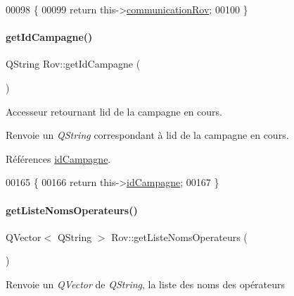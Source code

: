 \begin{DoxyCode}
00098 \{
00099     \textcolor{keywordflow}{return} this->\hyperlink{class_rov_a8e7aaa17ee2134f26d57241d11ab2a99}{communicationRov};
00100 \}
\end{DoxyCode}
\mbox{\label{class_rov_aaf98d93ef9b164a2e1766494d9577b57}} 
\paragraph{\texorpdfstring{get\+Id\+Campagne()}{getIdCampagne()}}
{\footnotesize\ttfamily Q\+String Rov\+::get\+Id\+Campagne (\begin{DoxyParamCaption}{ }\end{DoxyParamCaption})}

Accesseur retournant l\textquotesingle{}id de la campagne en cours.

\begin{DoxyReturn}{Renvoie}
un {\itshape Q\+String} correspondant à l\textquotesingle{}id de la campagne en cours. 
\end{DoxyReturn}


Références \hyperlink{class_rov_aaaed58cd7ee9edbeab5251cd413a1bae}{id\+Campagne}.


\begin{DoxyCode}
00165 \{
00166     \textcolor{keywordflow}{return} this->\hyperlink{class_rov_aaaed58cd7ee9edbeab5251cd413a1bae}{idCampagne};
00167 \}
\end{DoxyCode}
\mbox{\label{class_rov_ab585cb1f82344ba0a64a28488910b262}} 
\paragraph{\texorpdfstring{get\+Liste\+Noms\+Operateurs()}{getListeNomsOperateurs()}}
{\footnotesize\ttfamily Q\+Vector$<$ Q\+String $>$ Rov\+::get\+Liste\+Noms\+Operateurs (\begin{DoxyParamCaption}{ }\end{DoxyParamCaption})}

\begin{DoxyReturn}{Renvoie}
un {\itshape Q\+Vector} de {\itshape Q\+String}, la liste des noms des opérateurs 
\end{DoxyReturn}


